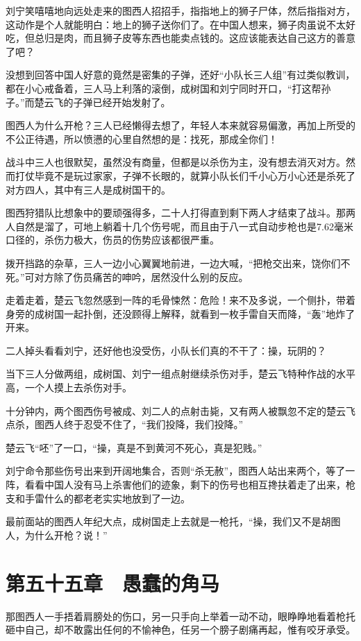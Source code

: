 刘宁笑嘻嘻地向远处走来的图西人招招手，指指地上的狮子尸体，然后指指对方，这动作是个人就能明白：地上的狮子送你们了。在中国人想来，狮子肉虽说不太好吃，但总归是肉，而且狮子皮等东西也能卖点钱的。这应该能表达自己这方的善意了吧？

没想到回答中国人好意的竟然是密集的子弹，还好“小队长三人组”有过类似教训，都在小心戒备着，三人马上利落的滚倒，成树国和刘宁同时开口，“打这帮孙子。”而楚云飞的子弹已经开始发射了。

图西人为什么开枪？三人已经懒得去想了，年轻人本来就容易偏激，再加上所受的不公正待遇，所以愤懑的心里自然想的是：找死，那成全你们！

战斗中三人也很默契，虽然没有商量，但都是以杀伤为主，没有想去消灭对方。然而打仗毕竟不是玩过家家，子弹不长眼的，就算小队长们千小心万小心还是杀死了对方四人，其中有三人是成树国干的。

图西狩猎队比想象中的要顽强得多，二十人打得直到剩下两人才结束了战斗。那两人自然是溜了，可地上躺着十几个伤号呢，而且由于八一式自动步枪也是7.62毫米口径的，杀伤力极大，伤员的伤势应该都很严重。

拨开挡路的杂草，三人一边小心翼翼地前进，一边大喊，“把枪交出来，饶你们不死。”可对方除了伤员痛苦的呻吟，居然没什么别的反应。

走着走着，楚云飞忽然感到一阵的毛骨悚然：危险！来不及多说，一个侧扑，带着身旁的成树国一起扑倒，还没顾得上解释，就看到一枚手雷自天而降，“轰”地炸了开来。

二人掉头看看刘宁，还好他也没受伤，小队长们真的不干了：操，玩阴的？

当下三人分做两组，成树国、刘宁一组点射继续杀伤对手，楚云飞特种作战的水平高，一个人摸上去杀伤对手。

十分钟内，两个图西伤号被成、刘二人的点射击毙，又有两人被飘忽不定的楚云飞点杀，图西人终于忍受不住了，“我们投降，我们投降。”

楚云飞“呸”了一口，“操，真是不到黄河不死心，真是犯贱。”

刘宁命令那些伤号出来到开阔地集合，否则“杀无赦”，图西人站出来两个，等了一阵，看看中国人没有马上杀害他们的迹象，剩下的伤号也相互搀扶着走了出来，枪支和手雷什么的都老老实实地放到了一边。

最前面站的图西人年纪大点，成树国走上去就是一枪托，“操，我们又不是胡图人，为什么开枪？说！”

\section{第五十五章　愚蠢的角马}

那图西人一手捂着肩膀处的伤口，另一只手向上举着一动不动，眼睁睁地看着枪托砸中自己，却不敢露出任何的不愉神色，任另一个膀子剧痛再起，惟有咬牙承受。

